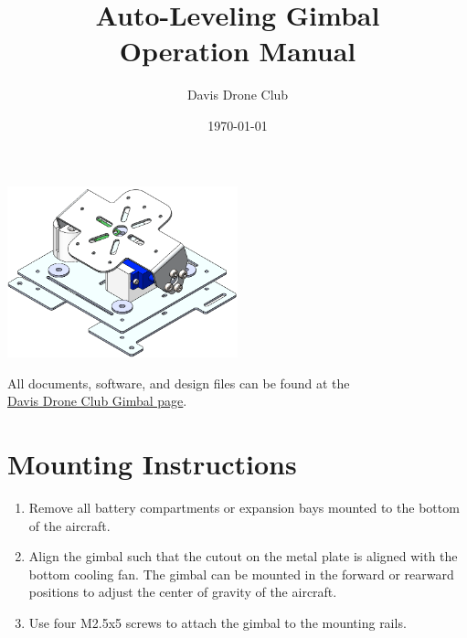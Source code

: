 \documentclass[11pt]{article} %
\title{Auto-Leveling Gimbal \\ Operation Manual}
\author{Davis Drone Club}
\date{\today} %
\begin{document}
\maketitle
\begin{center}
\includegraphics[width = 0.5\textwidth]{Pictures/cover.png}
\end{center}

\newpage
\tableofcontents
{}
\newpage
\listoffigures
\vspace{3cm}
\begin{center}
All documents, software, and design files can be found at the \\
\href{https://github.com/DavisDroneClub/gimbal}{Davis Drone Club Gimbal page}.
\end{center}
\newpage
{}
\setlength{\parskip}{1em}





\section{Mounting Instructions}

\begin{enumerate}
\item Remove all battery compartments or expansion bays mounted to the bottom of the aircraft.
\item Align the gimbal such that the cutout on the metal plate is aligned with the bottom cooling fan. The gimbal can be mounted in the forward or rearward positions to adjust the center of gravity of the aircraft. 
\item Use four M2.5x5 screws to attach the gimbal to the mounting rails. 
\end{enumerate}
\end{document}
